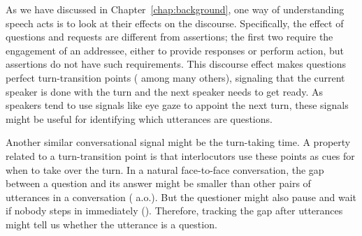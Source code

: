 



As we have discussed in Chapter~\ref{chap:background}, one way of understanding speech acts is to look at their effects on the discourse. Specifically, the effect of questions and requests are different from assertions; the first two require the engagement of an addressee, either to provide responses or perform action, but assertions do not have such requirements. This discourse effect makes questions perfect turn-transition points (\cite{duncan1972turn} among many others), signaling that the current speaker is done with the turn and the next speaker needs to get ready. As speakers tend to use signals like eye gaze to appoint the next turn, these signals might be useful for identifying which utterances are questions. 

Another similar conversational signal might be the turn-taking time. A property related to a turn-transition point is that interlocutors use these points as cues for when to take over the turn. In a natural face-to-face conversation, the gap between a question and its answer might be smaller than other pairs of utterances in a conversation (\citealt{tice2011turn} a.o.). But the questioner might also pause and wait if nobody steps in immediately (\cite{sacks1978pause}). Therefore, tracking the gap after utterances might tell us whether the utterance is a question.

